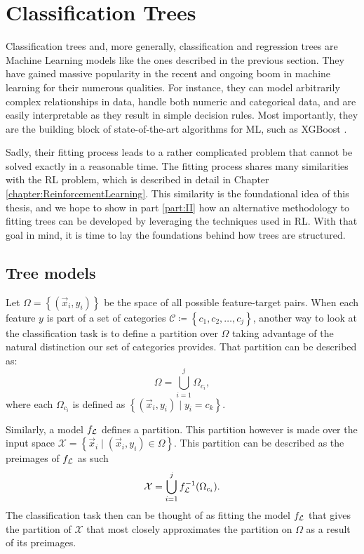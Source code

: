 \section{Classification Trees}

Classification trees and, more generally, classification and regression trees
are Machine Learning models like the ones described in the previous section.
They have gained massive popularity in the recent and ongoing boom in machine
learning for their numerous qualities. For instance, they can model arbitrarily
complex relationships in data, handle both numeric and categorical data, and are
easily interpretable as they result in simple decision rules. Most importantly,
they are the building block of state-of-the-art algorithms for ML, such as
XGBoost \cite{XGBoost}.

Sadly, their fitting process leads to a rather complicated problem that cannot
be solved exactly in a reasonable time. The fitting process shares many
similarities with the RL problem, which is described in detail in Chapter
\ref{chapter:ReinforcementLearning}. This similarity is the foundational idea of
this thesis, and we hope to show in part \ref{part:II} how an alternative
methodology to fitting trees can be developed by leveraging the techniques used
in RL. With that goal in mind, it is time to lay the foundations behind how trees are structured.

\subsection{Tree models}

Let $\Omega = \left\{ (\vec{x}_i, y_i) \right\}$ be the space of all possible
feature-target pairs. When each feature $y$ is part of a set of categories
$\mathcal{C} \coloneqq \left\{ c_1, c_2, \dots, c_j \right\}$, another way to
look at the classification task is to define a partition over $\Omega$ taking
advantage of the natural distinction our set of categories provides. That
partition can be described as:
\[
    \Omega = \bigcup_{i=1}^{j} \Omega_{c_i},
\]
where each $\Omega_{c_i}$ is defined as $\left\{ (\vec{x}_i, y_i) \mid y_i = c_k
\right\}$.

Similarly, a model $f_{\mathcal{L}}$ defines a partition. This partition however is made
over the input space $\mathcal{X} = \left\{ \vec{x}_i \mid (\vec{x}_i, y_i) \in
\Omega \right\}$. This partition can be described as the preimages of $f_{\mathcal{L}}$ as
such
\[
    \mathcal{X} = \bigcup_{i=1}^{j} f_{\mathcal{L}}^{-1}(\Omega_{c_i}).
\]
The classification task then can be thought of as fitting the model $f_{\mathcal{L}}$ that
gives the partition of $\mathcal{X}$ that most closely approximates the
partition on $\Omega$ as a result of its preimages.

